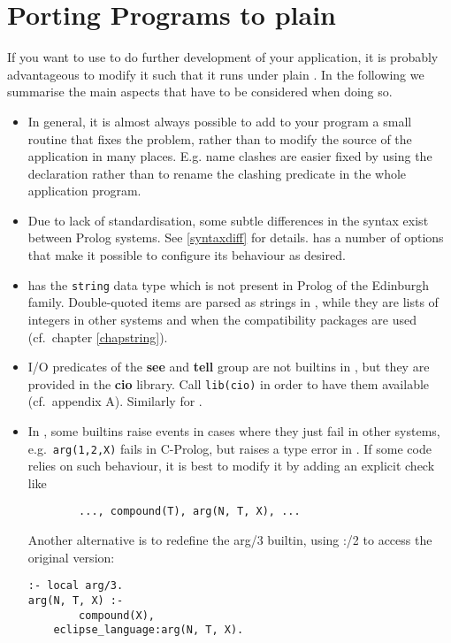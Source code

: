 \section{Porting Programs to plain {\eclipse}}
If you want to use {\eclipse} to do further development of your application,
it is probably advantageous to modify it such that it runs under plain
{\eclipse}.
In the following we summarise the main aspects that have to be considered
when doing so.

\begin{itemize}
\item
In general, it is almost always possible to add to your program
a small routine that fixes the problem, rather than to modify
the source of the application in many places.
E.g. name clashes are easier fixed
by using the  declaration rather than to rename
the clashing predicate in the whole application program.

\item
Due to lack of standardisation, some subtle differences in the
syntax exist between Prolog systems. See \ref{syntaxdiff}
for details. {\eclipse} has a number of options that make it possible
to configure its behaviour as desired.

\item
{\eclipse} has the {\tt string} data type which is not present in Prolog
of the Edinburgh family.
Double-quoted items are parsed as strings in {\eclipse}, while they are
lists of integers in other systems and when the compatibility
packages are used (cf.\ chapter \ref{chapstring}).

\item
I/O predicates of the {\bf see} and {\bf tell} group are not builtins
in {\eclipse}, but they are provided in the {\bf cio} library.
Call {\tt lib(cio)} in order to have them available (cf.\ appendix A).
Similarly for .

\item
In {\eclipse}, some builtins raise events in cases where they just fail
in other systems, e.g.\ {\tt arg(1,2,X)} fails in C-Prolog, but
raises a type error in {\eclipse}.
If some code relies on such behaviour, it is best to modify it by
adding an explicit check like
\begin{verbatim}
        ..., compound(T), arg(N, T, X), ...
\end{verbatim}

Another alternative is to redefine the arg/3 builtin, using
:/2 to access the original version:
\begin{verbatim}
:- local arg/3.
arg(N, T, X) :-
        compound(X),
	eclipse_language:arg(N, T, X).
\end{verbatim}


\end{itemize}
